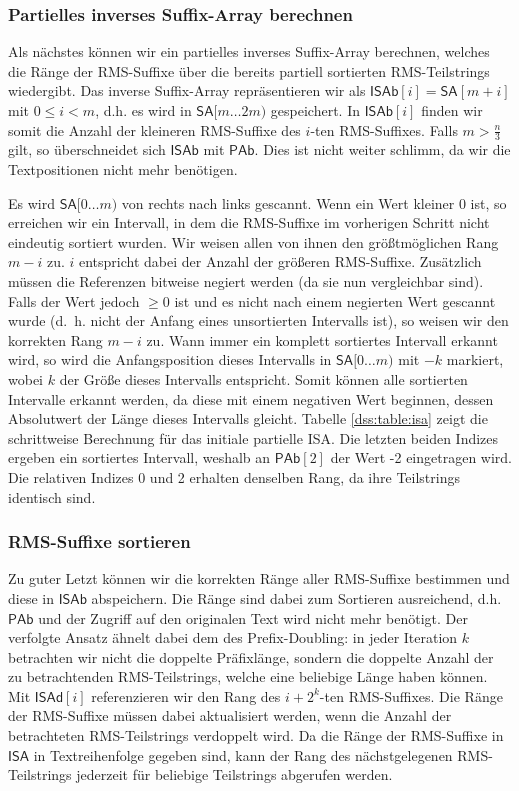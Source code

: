 \subsubsection{Partielles inverses Suffix-Array berechnen}
Als nächstes können wir ein partielles inverses Suffix-Array berechnen, welches die Ränge der RMS-Suffixe über die bereits partiell sortierten RMS-Teilstrings wiedergibt. Das inverse Suffix-Array repräsentieren wir als $\mathsf{ISAb}[i] = \mathsf{SA}[m + i]$ mit $0 \leq i < m$, d.h. es wird in $\mathsf{SA}[m\dots 2m)$ gespeichert. In $\mathsf{ISAb}[i]$ finden wir somit die Anzahl der kleineren RMS-Suffixe des $i$-ten RMS-Suffixes. Falls $m > \frac{n}{3}$ gilt, so überschneidet sich $\mathsf{ISAb}$ mit $\mathsf{PAb}$. Dies ist nicht weiter schlimm, da wir die Textpositionen nicht mehr benötigen.

Es wird $\mathsf{SA}[0\dots m)$ von rechts nach links gescannt. Wenn ein Wert kleiner 0 ist, so erreichen wir ein Intervall, in dem die RMS-Suffixe im vorherigen Schritt nicht eindeutig sortiert wurden. Wir weisen allen von ihnen den größtmöglichen Rang $m-i$ zu. $i$ entspricht dabei der Anzahl der größeren RMS-Suffixe. Zusätzlich müssen die Referenzen bitweise negiert werden (da sie nun \glqq vergleichbar\grqq{} sind). Falls der Wert jedoch $\geq 0$ ist und es nicht nach einem negierten Wert gescannt wurde (d.~h. nicht der Anfang eines unsortierten Intervalls ist), so weisen wir den korrekten Rang $m-i$ zu. Wann immer ein komplett sortiertes Intervall erkannt wird, so wird die Anfangsposition dieses Intervalls in $\mathsf{SA}[0\dots m)$ mit $-k$ markiert, wobei $k$ der Größe dieses Intervalls entspricht. Somit können alle sortierten Intervalle erkannt werden, da diese mit einem negativen Wert beginnen, dessen Absolutwert der Länge dieses Intervalls gleicht. Tabelle \ref{dss:table:isa} zeigt die schrittweise Berechnung für das initiale partielle ISA. Die letzten beiden Indizes ergeben ein sortiertes Intervall, weshalb an $\mathsf{PAb}[2]$ der Wert -2 eingetragen wird. Die relativen Indizes 0 und 2 erhalten denselben Rang, da ihre Teilstrings identisch sind.


\subsubsection{RMS-Suffixe sortieren}
Zu guter Letzt können wir die korrekten Ränge aller RMS-Suffixe bestimmen und diese in $\mathsf{ISAb}$ abspeichern. Die Ränge sind dabei zum Sortieren ausreichend, d.h. $\mathsf{PAb}$ und der Zugriff auf den originalen Text wird nicht mehr benötigt. Der verfolgte Ansatz ähnelt dabei dem des Prefix-Doubling: in jeder Iteration $k$ betrachten wir nicht die doppelte Präfixlänge, sondern die doppelte Anzahl der zu betrachtenden RMS-Teilstrings, welche eine beliebige Länge haben können. Mit $\mathsf{ISAd}[i]$ referenzieren wir den Rang des $i + 2^k$-ten RMS-Suffixes. Die Ränge der RMS-Suffixe müssen dabei aktualisiert werden, wenn die Anzahl der betrachteten RMS-Teilstrings verdoppelt wird. Da die Ränge der RMS-Suffixe in $\mathsf{ISA}$ in Textreihenfolge gegeben sind, kann der Rang des nächstgelegenen RMS-Teilstrings jederzeit für beliebige Teilstrings abgerufen werden.

